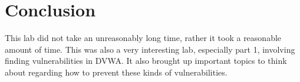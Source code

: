 \documentclass[11pt]{article}
\begin{document}
\section*{Conclusion}
This lab did not take an unreasonably long time, rather it took a reasonable amount of time. This was also
a very interesting lab, especially part 1, involving finding vulnerabilities in DVWA. It also brought up
important topics to think about regarding how to prevent these kinds of vulnerabilities.



\end{document}
